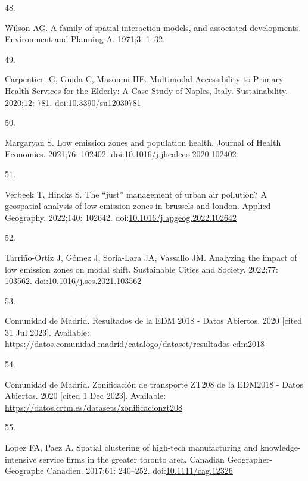 \documentclass[10pt,letterpaper]{article}
\newlength{\cslhangindent}
\newlength{\csllabelwidth}
\newlength{\cslentryspacingunit} %
\newenvironment{CSLReferences}[2] %
 {%
  \setlength{\parindent}{0pt}
  \ifodd #1
  \let\oldpar\par
  \def\par{\hangindent=\cslhangindent\oldpar}
  \fi
  \setlength{\parskip}{#2\cslentryspacingunit}
 }%
 {}
\newcommand{\CSLLeftMargin}[1]{\parbox[t]{\csllabelwidth}{#1}}
\newcommand{\CSLRightInline}[1]{\parbox[t]{\linewidth - \csllabelwidth}{#1}\break}
\begin{document}
\begin{CSLReferences}{0}{0}
\leavevmode{}%
\CSLLeftMargin{48. }%
\CSLRightInline{Wilson AG. A family of spatial interaction models, and
associated developments. Environment and Planning A. 1971;3: 1--32. }

\leavevmode{}%
\CSLLeftMargin{49. }%
\CSLRightInline{Carpentieri G, Guida C, Masoumi HE. Multimodal
{Accessibility} to {Primary Health Services} for the {Elderly}: {A Case
Study} of {Naples}, {Italy}. Sustainability. 2020;12: 781.
doi:\href{https://doi.org/10.3390/su12030781}{10.3390/su12030781}}

\leavevmode{}%
\CSLLeftMargin{50. }%
\CSLRightInline{Margaryan S. Low emission zones and population health.
Journal of Health Economics. 2021;76: 102402.
doi:\href{https://doi.org/10.1016/j.jhealeco.2020.102402}{10.1016/j.jhealeco.2020.102402}}

\leavevmode{}%
\CSLLeftMargin{51. }%
\CSLRightInline{Verbeek T, Hincks S. The {``just''} management of urban
air pollution? A geospatial analysis of low emission zones in brussels
and london. Applied Geography. 2022;140: 102642.
doi:\href{https://doi.org/10.1016/j.apgeog.2022.102642}{10.1016/j.apgeog.2022.102642}}

\leavevmode{}%
\CSLLeftMargin{52. }%
\CSLRightInline{Tarriño-Ortiz J, Gómez J, Soria-Lara JA, Vassallo JM.
Analyzing the impact of low emission zones on modal shift. Sustainable
Cities and Society. 2022;77: 103562.
doi:\href{https://doi.org/10.1016/j.scs.2021.103562}{10.1016/j.scs.2021.103562}}

\leavevmode{}%
\CSLLeftMargin{53. }%
\CSLRightInline{Comunidad de Madrid. Resultados de la {EDM} 2018 - Datos
Abiertos. 2020 {[}cited 31 Jul 2023{]}. Available:
\url{https://datos.comunidad.madrid/catalogo/dataset/resultados-edm2018}}

\leavevmode{}%
\CSLLeftMargin{54. }%
\CSLRightInline{Comunidad de Madrid. Zonificación de transporte ZT208 de
la EDM2018 - Datos Abiertos. 2020 {[}cited 1 Dec 2023{]}. Available:
\url{https://datos.crtm.es/datasets/zonificacionzt208}}

\leavevmode{}%
\CSLLeftMargin{55. }%
\CSLRightInline{Lopez FA, Paez A. Spatial clustering of high-tech
manufacturing and knowledge-intensive service firms in the greater
toronto area. Canadian Geographer-Geographe Canadien. 2017;61: 240--252.
doi:\href{https://doi.org/10.1111/cag.12326}{10.1111/cag.12326}}


\end{CSLReferences}
\end{document}
